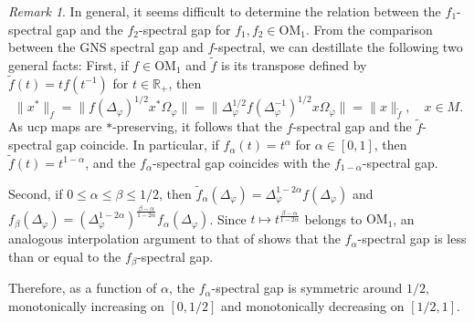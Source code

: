 \documentclass[a4paper,12pt]{amsart}
\newcommand{\norm}[1]{\lVert#1\rVert}
\newcommand{\OM}{\mathrm{OM}}
\renewcommand{\phi}{\varphi}
\newcommand{\IR}{\mathbb R}
\theoremstyle{plain}
\theoremstyle{remark}
\newtheorem{remark}[proposition]{Remark}
\theoremstyle{definition}
\begin{document}
\begin{remark}
    In general, it seems difficult to determine the relation between the $f_1$-spectral gap and the $f_2$-spectral gap for $f_1,f_2\in\OM_1$. From the comparison between the GNS spectral gap and $f$-spectral, we can destillate the following two general facts: First, if $f\in\OM_1$ and $\tilde f$ is its transpose defined by $\tilde f(t)=tf(t^{-1})$ for $t\in\IR_+$, then
    \begin{equation*}
        \norm{x^\ast}_f=\norm{f(\Delta_\phi)^{1/2}x^\ast\Omega_\phi}=\norm{\Delta_\phi^{1/2}f(\Delta_\phi^{-1})^{1/2}x\Omega_\phi}=\norm{x}_{\tilde f},\quad x\in M.
    \end{equation*}
    As ucp maps are $\ast$-preserving, it follows that the $f$-spectral gap and the $\tilde f$-spectral gap coincide. In particular, if $f_\alpha(t)=t^\alpha$ for $\alpha\in [0,1]$, then $\tilde f(t)=t^{1-\alpha}$, and the $f_\alpha$-spectral gap coincides with the $f_{1-\alpha}$-spectral gap.

    Second, if $0\leq \alpha\leq \beta\leq 1/2$, then $\tilde f_\alpha(\Delta_\phi)=\Delta_\phi^{1-2\alpha}f(\Delta_\phi)$ and $f_\beta(\Delta_\phi)=(\Delta_\phi^{1-2\alpha})^{\frac{\beta-\alpha}{1-2\alpha}} f_\alpha(\Delta_\phi)$. Since $t\mapsto t^{\frac{\beta-\alpha}{1-2\alpha}}$ belongs to $\OM_1$, an analogous interpolation argument to that of  shows that the $f_\alpha$-spectral gap is less than or equal to the $f_\beta$-spectral gap.

    Therefore, as a function of $\alpha$, the $f_\alpha$-spectral gap is symmetric around $1/2$, monotonically increasing on $[0,1/2]$ and monotonically decreasing on $[1/2,1]$.
\end{remark}




\end{document}
